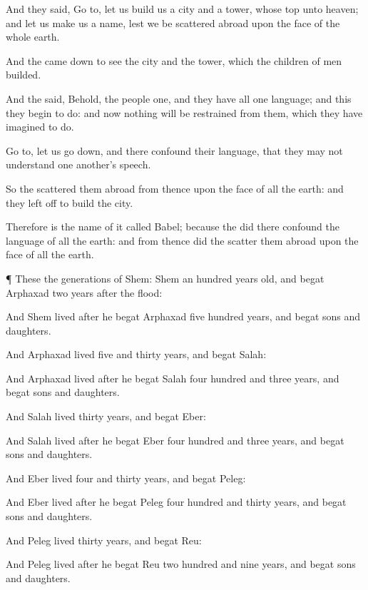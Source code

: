 {And they
said, Go
to, let us
build us a
city and a
tower, whose
top
{} unto
heaven; and let us
make us a
name, lest we be scattered
abroad upon the
face of the whole
earth.


\par }{\PP {}And the
{} came
down to
see the
city and the
tower, which the
children of
men
builded.

And the
{}
said, Behold, the
people
{}
one, and they have all
one
language; and this they
begin to
do: and now
nothing will be
restrained from them, which they have
imagined to
do.

Go
to, let us go
down, and there
confound their
language,
that they may not
understand
one
another’s
speech.

So the
{} scattered them
abroad from
thence upon the
face of all the
earth: and they left
off to
build the
city.

Therefore is the name of
it
called
Babel; because the
{} did there
confound the
language of all the
earth: and from thence
did the
{} scatter them
abroad upon the
face of all the
earth.


\par }{\PP {}¶ These
{} the
generations of
Shem:
Shem
{} an
hundred
years
old, and
begat
Arphaxad two
years
after the
flood:

And
Shem
lived
after he
begat
Arphaxad
five
hundred
years, and
begat
sons and
daughters.

And
Arphaxad
lived
five and
thirty
years, and
begat
Salah:

And
Arphaxad
lived
after he
begat
Salah
four
hundred and
three
years, and
begat
sons and
daughters.

And
Salah
lived
thirty
years, and
begat
Eber:

And
Salah
lived
after he
begat
Eber
four
hundred and
three
years, and
begat
sons and
daughters.

And
Eber
lived
four and
thirty
years, and
begat
Peleg:

And
Eber
lived
after he
begat
Peleg
four
hundred and
thirty
years, and
begat
sons and
daughters.

And
Peleg
lived
thirty
years, and
begat
Reu:

And
Peleg
lived
after he
begat
Reu two
hundred and
nine
years, and
begat
sons and
daughters.

}
